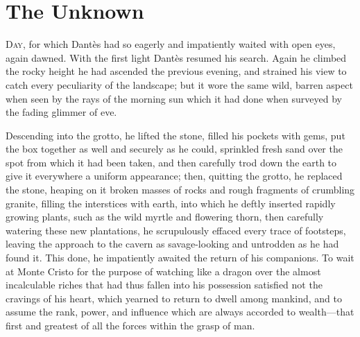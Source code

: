 \chapter{The Unknown} 

 \lettrine{D}{ay}, for which Dantès had so eagerly and impatiently waited with open eyes, again dawned. With the first light Dantès resumed his search. Again he climbed the rocky height he had ascended the previous evening, and strained his view to catch every peculiarity of the landscape; but it wore the same wild, barren aspect when seen by the rays of the morning sun which it had done when surveyed by the fading glimmer of eve. 

 Descending into the grotto, he lifted the stone, filled his pockets with gems, put the box together as well and securely as he could, sprinkled fresh sand over the spot from which it had been taken, and then carefully trod down the earth to give it everywhere a uniform appearance; then, quitting the grotto, he replaced the stone, heaping on it broken masses of rocks and rough fragments of crumbling granite, filling the interstices with earth, into which he deftly inserted rapidly growing plants, such as the wild myrtle and flowering thorn, then carefully watering these new plantations, he scrupulously effaced every trace of footsteps, leaving the approach to the cavern as savage-looking and untrodden as he had found it. This done, he impatiently awaited the return of his companions. To wait at Monte Cristo for the purpose of watching like a dragon over the almost incalculable riches that had thus fallen into his possession satisfied not the cravings of his heart, which yearned to return to dwell among mankind, and to assume the rank, power, and influence which are always accorded to wealth—that first and greatest of all the forces within the grasp of man. 

